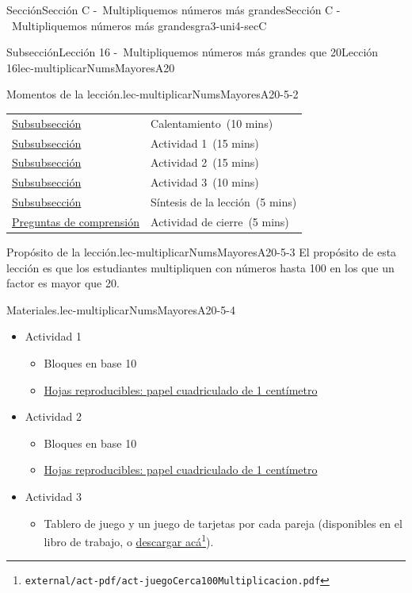 \documentclass[oneside,10pt,]{article}
\begin{document}
\begin{sectionptx}{Sección}{Sección C -~Multipliquemos números más grandes}{}{Sección C -~Multipliquemos números más grandes}{}{}{gra3-uni4-secC}
\begin{subsectionptx}{Subsección}{Lección 16 -~Multipliquemos números más grandes que 20}{}{Lección 16}{}{}{lec-multiplicarNumsMayoresA20}
\begin{introduction}{}
\begin{paragraphs}{Momentos de la lección.}{lec-multiplicarNumsMayoresA20-5-2}
\begin{longtable}[l]{ll}
\endfoot
\endlastfoot
\hyperref[lec-multiplicarNumsMayoresA20-warm]{Subsubsección }& Calentamiento~(10 mins)\\
\hyperref[lec-multiplicarNumsMayoresA20-act1]{Subsubsección }& Actividad 1~(15 mins)\\
\hyperref[lec-multiplicarNumsMayoresA20-act2]{Subsubsección }& Actividad 2~(15 mins)\\
\hyperref[lec-multiplicarNumsMayoresA20-act3]{Subsubsección }& Actividad 3~(10 mins)\\
\hyperref[lec-multiplicarNumsMayoresA20-sintesis]{Subsubsección }& Síntesis de la lección~(5 mins)\\
\hyperref[lec-multiplicarNumsMayoresA20-cool]{Preguntas de comprensión }& Actividad de cierre~(5 mins)\\
\end{longtable}
\end{paragraphs}%
\begin{paragraphs}{Propósito de la lección.}{lec-multiplicarNumsMayoresA20-5-3}%
El propósito de esta lección es que los estudiantes multipliquen con números hasta 100 en los que un factor es mayor que 20.%
\end{paragraphs}%
\begin{paragraphs}{Materiales.}{lec-multiplicarNumsMayoresA20-5-4}%
%
\begin{itemize}[label=\textbullet]
\item{}Actividad 1%
%
\begin{itemize}[label=$\circ$]
\item{}Bloques en base 10%
\item{}\hyperref[blm-papelCuadriculadoCentimetro]{Hojas reproducibles: papel cuadriculado de 1 centímetro}%
\end{itemize}
\item{}Actividad 2%
%
\begin{itemize}[label=$\circ$]
\item{}Bloques en base 10%
\item{}\hyperref[blm-papelCuadriculadoCentimetro]{Hojas reproducibles: papel cuadriculado de 1 centímetro}%
\end{itemize}
\item{}Actividad 3%
%
\begin{itemize}[label=$\circ$]
\item{}Tablero de juego y un juego de tarjetas por cada pareja (disponibles en el libro de trabajo, o \href{external/act-pdf/act-juegoCerca100Multiplicacion.pdf}{descargar acá}\footnote{\nolinkurl{external/act-pdf/act-juegoCerca100Multiplicacion.pdf}\label{lec-multiplicarNumsMayoresA20-5-4-2-3-2-1-2}}).%

\end{itemize}
\end{itemize}
\end{paragraphs}
\end{introduction}
\end{subsectionptx}
\end{sectionptx}
\end{document}
